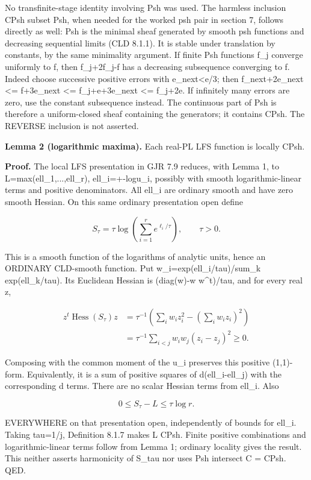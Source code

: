 \documentclass[
  11pt,
]{article}
\begin{document}
No transfinite-stage identity involving Psh was used. The harmless
inclusion CPsh subset Psh, when needed for the worked psh pair in
section 7, follows directly as well: Psh is the minimal sheaf generated
by smooth psh functions and decreasing sequential limits (CLD 8.1.1). It
is stable under translation by constants, by the same minimality
argument. If finite Psh functions f\_j converge uniformly to f, then
f\_j+2\textbar\textbar f\_j-f\textbar\textbar{} has a decreasing
subsequence converging to f. Indeed choose successive positive errors
with e\_next\textless e/3; then f\_next+2e\_next \textless= f+3e\_next
\textless= f\_j+e+3e\_next \textless= f\_j+2e. If infinitely many errors
are zero, use the constant subsequence instead. The continuous part of
Psh is therefore a uniform-closed sheaf containing the generators; it
contains CPsh. The REVERSE inclusion is not asserted.

\textbf{Lemma 2 (logarithmic maxima).} Each real-PL LFS function is
locally CPsh.

\textbf{Proof.} The local LFS presentation in GJR 7.9 reduces, with
Lemma 1, to L=max(ell\_1,...,ell\_r), ell\_i=+-log\textbar u\_i\textbar,
possibly with smooth logarithmic-linear terms and positive denominators.
All ell\_i are ordinary smooth and have zero smooth Hessian. On this
same ordinary presentation open define

\[
S_\tau=\tau\log\!\left(\sum_{i=1}^r e^{\ell_i/\tau}\right),\qquad\tau>0.
\]

This is a smooth function of the logarithms of analytic units, hence an
ORDINARY CLD-smooth function. Put w\_i=exp(ell\_i/tau)/sum\_k
exp(ell\_k/tau). Its Euclidean Hessian is (diag(w)-w w\^{}t)/tau, and
for every real z,

\[
\begin{aligned}z^t\operatorname{Hess}(S_\tau)z&=\tau^{-1}\left(\sum_i w_i z_i^2-\left(\sum_i w_i z_i\right)^2\right)\\&=\tau^{-1}\sum_{i<j}w_iw_j(z_i-z_j)^2\ge0.\end{aligned}
\]

Composing with the common moment of the u\_i preserves this positive
(1,1)-form. Equivalently, it is a sum of positive squares of
d\textquotesingle(ell\_i-ell\_j) with the corresponding
d\textquotesingle\textquotesingle{} terms. There are no scalar Hessian
terms from ell\_i. Also

\[
0\le S_\tau-L\le\tau\log r.
\]

EVERYWHERE on that presentation open, independently of bounds for
ell\_i. Taking tau=1/j, Definition 8.1.7 makes L CPsh. Finite positive
combinations and logarithmic-linear terms follow from Lemma 1; ordinary
locality gives the result. This neither asserts harmonicity of S\_tau
nor uses Psh intersect C = CPsh. QED.
\end{document}
